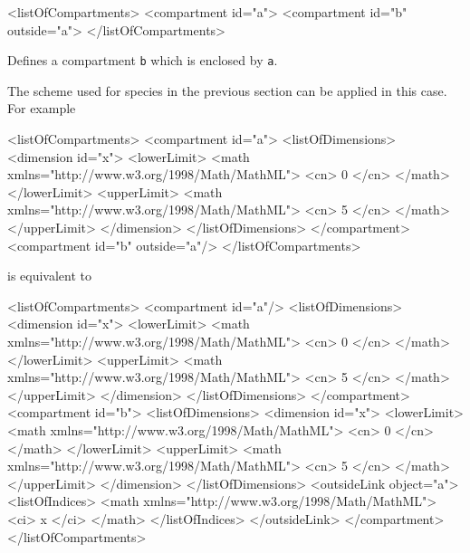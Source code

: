 \documentclass{cekarticle}
\begin{document}
\begin{example}
<listOfCompartments>
    <compartment id="a">
    <compartment id="b" outside="a">
</listOfCompartments>
\end{example}

Defines a compartment \texttt{b} which is enclosed by \texttt{a}.

The scheme used for species in the previous section can be applied in this case.
For example

\begin{example}
<listOfCompartments>
    <compartment id="a">
        <listOfDimensions>
            <dimension id="x">
                <lowerLimit>
                    <math xmlns="http://www.w3.org/1998/Math/MathML">
                        <cn> 0 </cn>
                    </math>
                </lowerLimit>
                <upperLimit>
                    <math xmlns="http://www.w3.org/1998/Math/MathML">
                        <cn> 5 </cn>
                    </math>
                </upperLimit>
            </dimension>
        </listOfDimensions>
    </compartment>
    <compartment id="b" outside="a"/>
</listOfCompartments>
\end{example}

is equivalent to

\begin{example}
<listOfCompartments>
    <compartment id="a"/>
        <listOfDimensions>
            <dimension id="x">
                <lowerLimit>
                    <math xmlns="http://www.w3.org/1998/Math/MathML">
                        <cn> 0 </cn>
                    </math>
                </lowerLimit>
                <upperLimit>
                    <math xmlns="http://www.w3.org/1998/Math/MathML">
                        <cn> 5 </cn>
                    </math>
                </upperLimit>
            </dimension>
        </listOfDimensions>
    </compartment>
    <compartment id="b">
        <listOfDimensions>
            <dimension id="x">
                <lowerLimit>
                    <math xmlns="http://www.w3.org/1998/Math/MathML">
                        <cn> 0 </cn>
                    </math>
                </lowerLimit>
                <upperLimit>
                    <math xmlns="http://www.w3.org/1998/Math/MathML">
                        <cn> 5 </cn>
                    </math>
                </upperLimit>
            </dimension>
        </listOfDimensions>
        <outsideLink object="a">
            <listOfIndices>
                <math xmlns="http://www.w3.org/1998/Math/MathML">
                    <ci> x </ci>
                </math>
            </listOfIndices>
        </outsideLink>
    </compartment>
</listOfCompartments>
\end{example}
\end{document}
